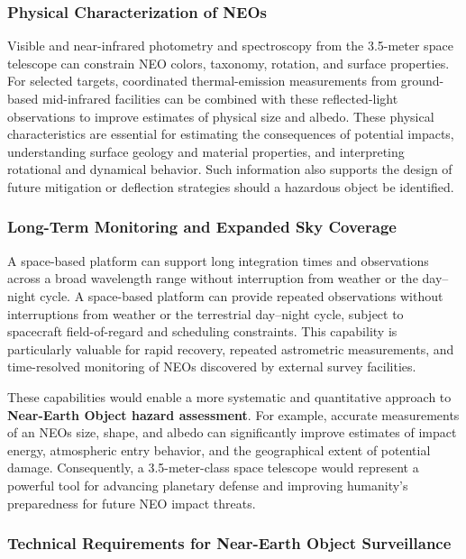 \subsubsection{Physical Characterization of NEOs}\label{physical-characterization-of-neos}

Visible and near-infrared photometry and spectroscopy from the 3.5-meter space telescope can constrain NEO colors, taxonomy, rotation, and surface properties. For selected targets, coordinated thermal-emission measurements from ground-based mid-infrared facilities can be combined with these reflected-light observations to improve estimates of physical size and albedo. These physical characteristics are essential for estimating the consequences of potential impacts, understanding surface geology and material properties, and interpreting rotational and dynamical behavior. Such information also supports the design of future mitigation or deflection strategies should a hazardous object be identified.

\subsubsection{Long-Term Monitoring and Expanded Sky Coverage}\label{long-term-monitoring-and-expanded-sky-coverage}

A space-based platform can support long integration times and observations across a broad wavelength range without interruption from weather or the day--night cycle. 
A space-based platform can provide repeated observations without interruptions from weather or the terrestrial day--night cycle, subject to spacecraft field-of-regard and scheduling constraints. This capability is particularly valuable for rapid recovery, repeated astrometric measurements, and time-resolved monitoring of NEOs discovered by external survey facilities.


These capabilities would enable a more systematic and quantitative approach to \textbf{Near-Earth Object hazard assessment}. For example, accurate measurements of an NEO\textquotesingle s size, shape, and albedo can significantly improve estimates of impact energy, atmospheric entry behavior, and the geographical extent of potential damage. Consequently, a 3.5-meter-class space telescope would represent a powerful tool for advancing planetary defense and improving humanity's preparedness for future NEO impact threats.

\subsubsection{Technical Requirements for Near-Earth Object Surveillance}

